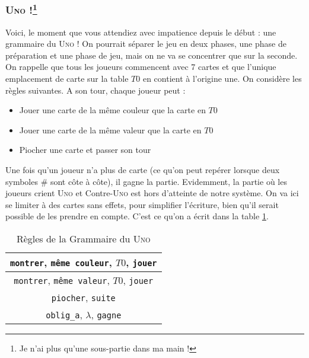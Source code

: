 \documentclass{cours}
\begin{document}
\subsubsection[\textsc{Uno !}]{\textsc{Uno !}\footnote{Je n'ai plus qu'une sous-partie dans ma main !}}
Voici, le moment que vous attendiez avec impatience depuis le début : une grammaire du \textsc{Uno} ! On pourrait séparer le jeu en deux phases, une phase de préparation et une phase de jeu, mais on ne va se concentrer que sur la seconde. \\
On rappelle que tous les joueurs commencent avec 7 cartes et que l'unique emplacement de carte sur la table $T0$ en contient à l'origine une. On considère les règles suivantes. A son tour, chaque joueur peut : 
\begin{itemize}
    \item Jouer une carte de la même couleur que la carte en $T0$
    \item Jouer une carte de la même valeur que la carte en $T0$
    \item Piocher une carte et passer son tour
\end{itemize}
Une fois qu'un joueur n'a plus de carte (ce qu'on peut repérer lorsque deux symboles \# sont côte à côte), il gagne la partie. Evidemment, la partie où les joueurs crient \textsc{Uno} et Contre-\textsc{Uno} est hors d'atteinte de notre système. On va ici se limiter à des cartes sans effets, pour simplifier l'écriture, bien qu'il serait possible de les prendre en compte. C'est ce qu'on a écrit dans la table \ref{table:grammar_uno}.
\begin{table}
    \centering
    \caption{Règles de la Grammaire du \textsc{Uno}}
    \label{table:grammar_uno}
    \begin{tabular}{c}
        \toprule
        \texttt{montrer}, \texttt{même couleur}, $T0$, \texttt{jouer}\\
        \midrule
        \texttt{montrer}, \texttt{même valeur}, $T0$, \texttt{jouer}\\
        \midrule
        \texttt{piocher}, \texttt{suite}\\
        \midrule
        \texttt{oblig\_a}, $\lambda$, \texttt{gagne}\\
        \bottomrule
    \end{tabular}
\end{table}
\end{document}
